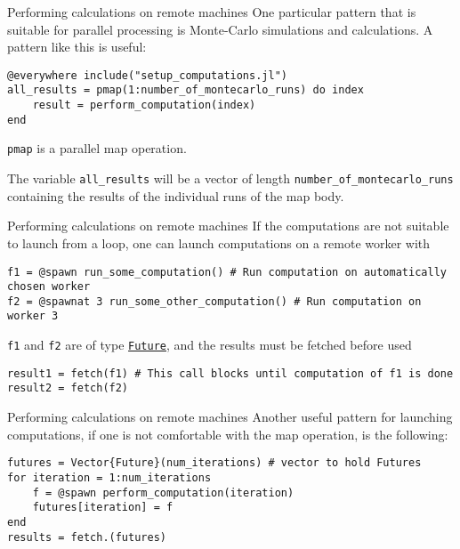 \documentclass[10pt]{beamer}
\begin{document}
\begin{frame}[fragile]{Performing calculations on remote machines}
One particular pattern that is suitable for parallel processing is Monte-Carlo simulations and calculations. A pattern like this is useful:
\begin{verbatim}
@everywhere include("setup_computations.jl")
all_results = pmap(1:number_of_montecarlo_runs) do index
    result = perform_computation(index)
end
\end{verbatim}
\verb+pmap+ is a parallel map operation.

The variable \verb+all_results+ will be a vector of length \verb+number_of_montecarlo_runs+ containing the results of the individual runs of the map body.
\end{frame}

\begin{frame}[fragile]{Performing calculations on remote machines}
If the computations are not suitable to launch from a loop, one can launch computations on a remote worker with
\begin{verbatim}
f1 = @spawn run_some_computation() # Run computation on automatically chosen worker
f2 = @spawnat 3 run_some_other_computation() # Run computation on worker 3
\end{verbatim}
\verb+f1+ and \verb+f2+ are of type \href{https://docs.julialang.org/en/v1/manual/parallel-computing/index.html#Multi-Core-or-Distributed-Processing-1}{\texttt{Future}}, and the results must be fetched before used
\begin{verbatim}
result1 = fetch(f1) # This call blocks until computation of f1 is done
result2 = fetch(f2)
\end{verbatim}
\end{frame}


\begin{frame}[fragile]{Performing calculations on remote machines}
Another useful pattern for launching computations, if one is not comfortable with the map operation, is the following:
\begin{verbatim}
futures = Vector{Future}(num_iterations) # vector to hold Futures
for iteration = 1:num_iterations
    f = @spawn perform_computation(iteration)
    futures[iteration] = f
end
results = fetch.(futures)
\end{verbatim}
\end{frame}
\end{document}

